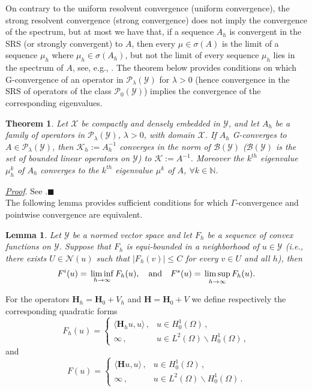 \documentclass[11pt, epsf]{amsart}
\newtheorem{Theo}{Theorem}
\newtheorem{Lem}{Lemma}
\begin{document}
On contrary to the uniform resolvent convergence (uniform convergence), the strong resolvent convergence (strong convergence) does not imply the convergence of the spectrum, but at most we have that, if a sequence $A_h$ is convergent in the SRS (or strongly convergent) to $A$, then every $\mu\in\sigma(A)$ is the limit of a sequence $\mu_h$ where $\mu_h \in\sigma(A_h)$, but not the limit of every sequence $\mu_h$ lies in the spectrum of $A$, see, e.g., \cite{WEI97}. The theorem below provides conditions on which G-convergence of an operator in $\mathcal{P}_\lambda(\mathcal{Y})$ for $\lambda>0$ (hence convergence in the SRS of operators of the class $\mathcal{P}_0(\mathcal{Y})$) implies the convergence of the corresponding eigenvalues.
\begin{Theo}
\emph{
Let $\mathcal{X}$ be compactly and densely embedded in $\mathcal{Y}$, and let $A_h$ be a family of operators in $\mathcal{P}_\lambda(\mathcal{Y})$,
$\lambda>0$, with domain $\mathcal{X}$. If $A_h$ G-converges to $A\in\mathcal{P}_\lambda(\mathcal{Y})$, then $\mathcal{K}_h:=A_h^{-1}$ converges in the norm of $\mathcal{B}(\mathcal{Y})$ ($\mathcal{B}(\mathcal{Y})$ is the set of bounded linear operators on $\mathcal{Y}$) to $\mathcal{K}:=A^{-1}$. Moreover the $k^{th}$ eigenvalue $\mu_h^k$ of $A_h$ converges to the $k^{th}$ eigenvalue $\mu^k$ of $A$, $\forall k\in \mathbb{N}$.
}
\end{Theo}
\hspace{-4mm}\underline{\emph{Proof}}. See \cite{ALM}.\hfill{$\blacksquare$}\\

The following lemma provides sufficient conditions for which $\Gamma$-convergence and pointwise convergence are equivalent.
\begin{Lem}
\emph{
Let $\mathcal{Y}$ be a normed vector space and let $F_h$ be a sequence of convex functions on $\mathcal{Y}$. Suppose that $F_h$ is equi-bounded in a neighborhood of $u\in\mathcal{Y}$ (i.e., there exists $U\in\mathcal{N}(u)$ such that $|F_h(v)|\leq C$ for every $v\in U$ and all $h$), then
$$
F^i(u)={\displaystyle}\liminf_{h\to\infty}F_h(u),\quad\text{and}\quad F^s(u)={\displaystyle}\limsup_{h\to\infty}F_h(u).
$$
}
\end{Lem}
For the operators $\mathbf{H}_h=\mathbf{H}_0+V_h$ and $\mathbf{H}=\mathbf{H}_0+V$ we define respectively the corresponding quadratic forms
\begin{equation*}
F_h(u)=\left\{ \begin{array}{ll}
\langle \mathbf{H}_hu,u\rangle\,,& u\in H^1_0(\Omega) \, , \\
\infty\,,& u\in L^2(\Omega)\backslash H^1_0(\Omega)\, ,
\end{array} \right.
\end{equation*}
and
\begin{equation*}
F(u)=\left\{ \begin{array}{ll}
\langle \mathbf{H}u,u\rangle\,,& u\in H^1_0(\Omega) \, , \\
\infty\,,& u\in L^2(\Omega)\backslash H^1_0(\Omega)\, .
\end{array} \right.
\end{equation*}
\end{document}

